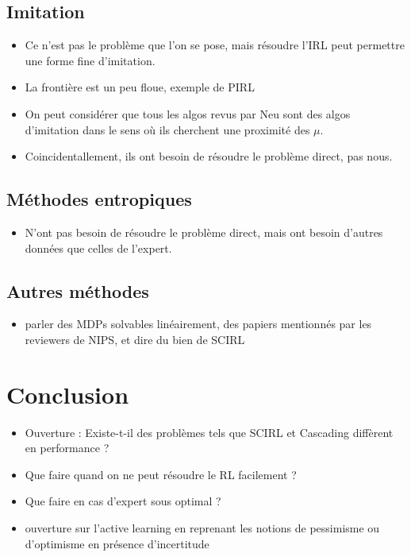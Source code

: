 \documentclass[11pt]{article}
\begin{document}
\subsection{Imitation}
\label{sec-7-1}

\begin{itemize}
\item Ce n'est pas le problème que l'on se pose, mais résoudre l'IRL peut permettre une forme fine d'imitation.
\item La frontière est un peu floue, exemple de PIRL
\item On peut considérer que tous les algos revus par Neu sont des algos d'imitation dans le sens où ils cherchent une proximité des $\mu$.
\item Coincidentallement, ils ont besoin de résoudre le problème direct, pas nous.
\end{itemize}
\subsection{Méthodes entropiques}
\label{sec-7-2}

\begin{itemize}
\item N'ont pas besoin de résoudre le problème direct, mais ont besoin d'autres données que celles de l'expert.
\end{itemize}
\subsection{Autres méthodes}
\label{sec-7-3}

\begin{itemize}
\item parler des MDPs solvables linéairement, des papiers mentionnés par les reviewers de NIPS, et dire du bien de SCIRL
\end{itemize}
\section{Conclusion}
\label{sec-8}

\begin{itemize}
\item Ouverture : Existe-t-il des problèmes tels que SCIRL et Cascading diffèrent en performance ?
\item Que faire quand on ne peut résoudre le RL facilement ?
\item Que faire en cas d'expert sous optimal ?
\item ouverture sur l'active learning en reprenant les notions de pessimisme ou d'optimisme en présence d'incertitude
\end{itemize}
   
\end{document}
